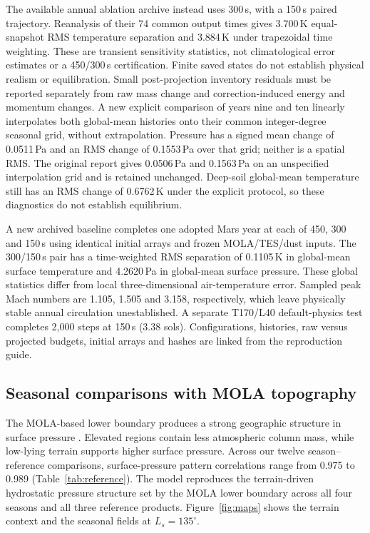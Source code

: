 \documentclass{article} %
\begin{document}
The available annual ablation archive instead uses 300\,s, with a 150\,s paired trajectory. Reanalysis of their 74 common output times gives 3.700\,K equal-snapshot RMS temperature separation and 3.884\,K under trapezoidal time weighting. These are transient sensitivity statistics, not climatological error estimates or a 450/300\,s certification. Finite saved states do not establish physical realism or equilibration. Small post-projection inventory residuals must be reported separately from raw mass change and correction-induced energy and momentum changes. A new explicit comparison of years nine and ten linearly interpolates both global-mean histories onto their common integer-degree seasonal grid, without extrapolation. Pressure has a signed mean change of 0.0511\,Pa and an RMS change of 0.1553\,Pa over that grid; neither is a spatial RMS. The original report gives 0.0506\,Pa and 0.1563\,Pa on an unspecified interpolation grid and is retained unchanged. Deep-soil global-mean temperature still has an RMS change of 0.6762\,K under the explicit protocol, so these diagnostics do not establish equilibrium.

A new archived baseline completes one adopted Mars year at each of 450, 300 and 150\,s using identical initial arrays and frozen MOLA/TES/dust inputs. The 300/150\,s pair has a time-weighted RMS separation of 0.1105\,K in global-mean surface temperature and 4.2620\,Pa in global-mean surface pressure. These global statistics differ from local three-dimensional air-temperature error. Sampled peak Mach numbers are 1.105, 1.505 and 3.158, respectively, which leave physically stable annual circulation unestablished. A separate T170/L40 default-physics test completes 2,000 steps at 150\,s (3.38 sols). Configurations, histories, raw versus projected budgets, initial arrays and hashes are linked from the reproduction guide.

\subsection{Seasonal comparisons with MOLA topography}
The MOLA-based lower boundary produces a strong geographic structure in surface pressure \citep{smith2001, mola}. Elevated regions contain less atmospheric column mass, while low-lying terrain supports higher surface pressure. Across our twelve season--reference comparisons, surface-pressure pattern correlations range from 0.975 to 0.989 (Table~\ref{tab:reference}). The model reproduces the terrain-driven hydrostatic pressure structure set by the MOLA lower boundary across all four seasons and all three reference products. Figure~\ref{fig:maps} shows the terrain context and the seasonal fields at $L_s=135^\circ$.
\end{document}
